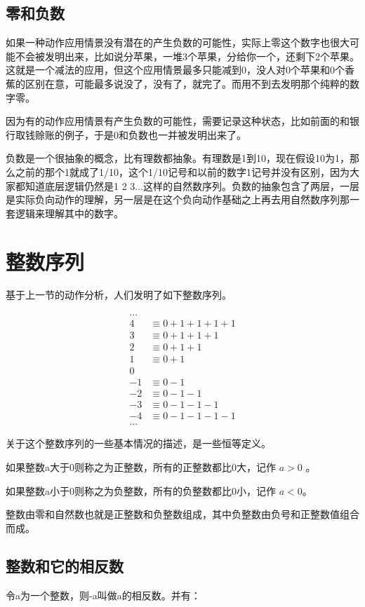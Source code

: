 \documentclass[12pt,oneside]{book}
\begin{document}
\subsection{零和负数}
如果一种动作应用情景没有潜在的产生负数的可能性，实际上零这个数字也很大可能不会被发明出来，比如说分苹果，一堆3个苹果，分给你一个，还剩下2个苹果。这就是一个减法的应用，但这个应用情景最多只能减到0，没人对0个苹果和0个香蕉的区别在意，可能最多说没了，没有了，就完了。而用不到去发明那个纯粹的数字零。

因为有的动作应用情景有产生负数的可能性，需要记录这种状态，比如前面的和银行取钱赊账的例子，于是0和负数也一并被发明出来了。

负数是一个很抽象的概念，比有理数都抽象。有理数是1到10，现在假设10为1，那么之前的那个1就成了1/10，这个1/10记号和以前的数字1记号并没有区别，因为大家都知道底层逻辑仍然是1 2 3...这样的自然数序列。负数的抽象包含了两层，一层是实际负向动作的理解，另一层是在这个负向动作基础之上再去用自然数序列那一套逻辑来理解其中的数字。



\section{整数序列}
基于上一节的动作分析，人们发明了如下整数序列。

\begin{align*}
...\\
4 &\equiv 0 + 1 + 1 + 1 +1 \\
3 &\equiv 0 + 1 + 1 +1 \\
2 &\equiv 0 + 1 +1 \\
1 &\equiv 0 + 1 \\
0\\
-1 &\equiv 0 - 1 \\
-2 &\equiv 0 - 1 -1\\
-3 &\equiv 0 - 1 - 1 -1 \\
-4 &\equiv 0 - 1 - 1 - 1 -1\\
...
\end{align*}

关于这个整数序列的一些基本情况的描述，是一些恒等定义。

如果整数a大于0则称之为正整数，所有的正整数都比0大，记作 $a>0$ 。

如果整数a小于0则称之为负整数，所有的负整数都比0小，记作 $a<0$。

整数由零和自然数也就是正整数和负整数组成，其中负整数由负号和正整数值组合而成。


\subsection{整数和它的相反数}
令a为一个整数，则-a叫做a的相反数。并有： 
\end{document}

